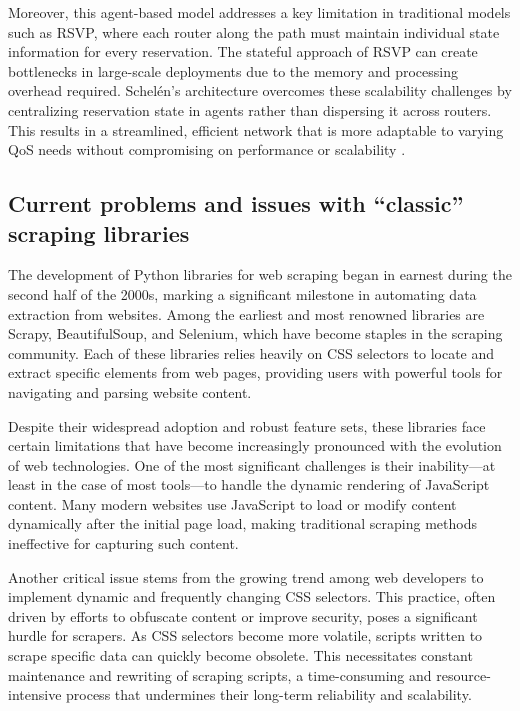 Moreover, this agent-based model addresses a key limitation in traditional models such as RSVP, where each router along the path must maintain individual state information for every reservation. The stateful approach of RSVP can create bottlenecks in large-scale deployments due to the memory and processing overhead required. Schelén’s architecture overcomes these scalability challenges by centralizing reservation state in agents rather than dispersing it across routers. This results in a streamlined, efficient network that is more adaptable to varying QoS needs without compromising on performance or scalability \cite{5}.


\subsection{Current problems and issues with “classic” scraping libraries}

The development of Python libraries for web scraping began in earnest during the second half of the 2000s, marking a significant milestone in automating data extraction from websites. Among the earliest and most renowned libraries are Scrapy, BeautifulSoup, and Selenium, which have become staples in the scraping community. Each of these libraries relies heavily on CSS selectors to locate and extract specific elements from web pages, providing users with powerful tools for navigating and parsing website content.

Despite their widespread adoption and robust feature sets, these libraries face certain limitations that have become increasingly pronounced with the evolution of web technologies. One of the most significant challenges is their inability—at least in the case of most tools—to handle the dynamic rendering of JavaScript content. Many modern websites use JavaScript to load or modify content dynamically after the initial page load, making traditional scraping methods ineffective for capturing such content.

Another critical issue stems from the growing trend among web developers to implement dynamic and frequently changing CSS selectors. This practice, often driven by efforts to obfuscate content or improve security, poses a significant hurdle for scrapers. As CSS selectors become more volatile, scripts written to scrape specific data can quickly become obsolete. This necessitates constant maintenance and rewriting of scraping scripts, a time-consuming and resource-intensive process that undermines their long-term reliability and scalability.

